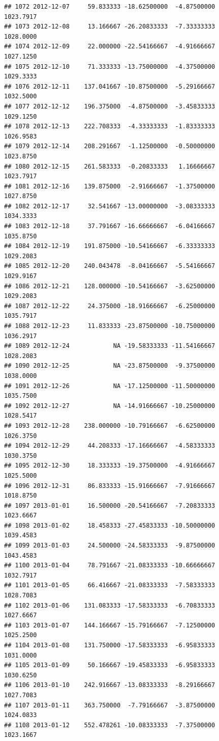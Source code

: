 \documentclass[
]{article}
\begin{document}
\begin{verbatim}
## 1072 2012-12-07     59.833333 -18.62500000  -4.87500000    1023.7917
## 1073 2012-12-08     13.166667 -26.20833333  -7.33333333    1028.0000
## 1074 2012-12-09     22.000000 -22.54166667  -4.91666667    1027.1250
## 1075 2012-12-10     71.333333 -13.75000000  -4.37500000    1029.3333
## 1076 2012-12-11    137.041667 -10.87500000  -5.29166667    1032.5000
## 1077 2012-12-12    196.375000  -4.87500000  -3.45833333    1029.1250
## 1078 2012-12-13    222.708333  -4.33333333  -1.83333333    1026.9583
## 1079 2012-12-14    208.291667  -1.12500000  -0.50000000    1023.8750
## 1080 2012-12-15    261.583333  -0.20833333   1.16666667    1023.7917
## 1081 2012-12-16    139.875000  -2.91666667  -1.37500000    1027.8750
## 1082 2012-12-17     32.541667 -13.00000000  -3.08333333    1034.3333
## 1083 2012-12-18     37.791667 -16.66666667  -6.04166667    1035.8750
## 1084 2012-12-19    191.875000 -10.54166667  -6.33333333    1029.2083
## 1085 2012-12-20    240.043478  -8.04166667  -5.54166667    1029.9167
## 1086 2012-12-21    128.000000 -10.54166667  -3.62500000    1029.2083
## 1087 2012-12-22     24.375000 -18.91666667  -6.25000000    1035.7917
## 1088 2012-12-23     11.833333 -23.87500000 -10.75000000    1036.2917
## 1089 2012-12-24            NA -19.58333333 -11.54166667    1028.2083
## 1090 2012-12-25            NA -23.87500000  -9.37500000    1038.0000
## 1091 2012-12-26            NA -17.12500000 -11.50000000    1035.7500
## 1092 2012-12-27            NA -14.91666667 -10.25000000    1028.5417
## 1093 2012-12-28    238.000000 -10.79166667  -6.62500000    1026.3750
## 1094 2012-12-29     44.208333 -17.16666667  -4.58333333    1030.3750
## 1095 2012-12-30     18.333333 -19.37500000  -4.91666667    1025.5000
## 1096 2012-12-31     86.833333 -15.91666667  -7.91666667    1018.8750
## 1097 2013-01-01     16.500000 -20.54166667  -7.20833333    1023.6667
## 1098 2013-01-02     18.458333 -27.45833333 -10.50000000    1039.4583
## 1099 2013-01-03     24.500000 -24.58333333  -9.87500000    1043.4583
## 1100 2013-01-04     78.791667 -21.08333333 -10.66666667    1032.7917
## 1101 2013-01-05     66.416667 -21.08333333  -7.58333333    1028.7083
## 1102 2013-01-06    131.083333 -17.58333333  -6.70833333    1027.6667
## 1103 2013-01-07    144.166667 -15.79166667  -7.12500000    1025.2500
## 1104 2013-01-08    131.750000 -17.58333333  -6.95833333    1031.0000
## 1105 2013-01-09     50.166667 -19.45833333  -6.95833333    1030.6250
## 1106 2013-01-10    242.916667 -13.08333333  -8.29166667    1027.7083
## 1107 2013-01-11    363.750000  -7.79166667  -3.87500000    1024.0833
## 1108 2013-01-12    552.478261 -10.08333333  -7.37500000    1023.1667

\end{verbatim}
\end{document}
